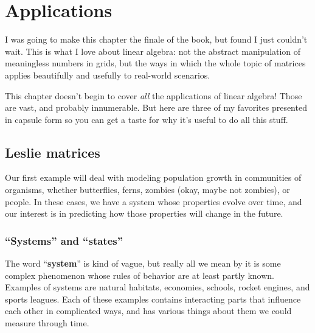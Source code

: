 

\titleformat{\section}[hang]{\normalfont\bfseries\Large}{}{0pt}{}
\renewcommand{\thesection}{}%
\renewcommand{\thesubsection}{L\arabic{subsection}.}%

\chapter{Applications}

I was going to make this chapter the finale of the book, but found I just
couldn't wait. This is what I love about linear algebra: not the abstract
manipulation of meaningless numbers in grids, but the ways in which the whole
topic of matrices applies beautifully and usefully to real-world scenarios.

This chapter doesn't begin to cover \textit{all} the applications of linear
algebra! Those are vast, and probably innumerable. But here are three of my
favorites presented in capsule form so you can get a taste for why it's useful
to do all this stuff.

\pagebreak

\section{Leslie matrices}


Our first example will deal with modeling population growth in communities of
organisms, whether butterflies, ferns, zombies (okay, maybe not zombies), or
people. In these cases, we have a system whose properties evolve over time, and
our interest is in predicting how those properties will change in the future.

\subsection{``Systems'' and ``states''}


The word ``\textbf{system}'' is kind of vague, but really all we mean by it is
some complex phenomenon whose rules of behavior are at least partly known.
Examples of systems are natural habitats, economies, schools, rocket engines,
and sports leagues. Each of these examples contains interacting parts that
influence each other in complicated ways, and has various things about them we
could measure through time.

